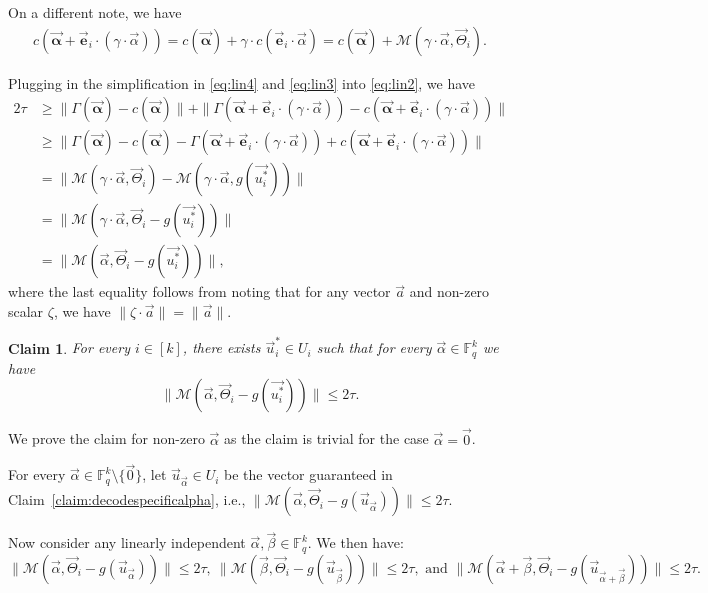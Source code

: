 \documentclass[10pt,a4paper]{article}
\newcommand{\F}{\mathbb{F}}
\renewcommand{\ge}{ \geqslant}
\renewcommand{\le}{ \leqslant}
\newtheorem{claim}[theorem]{Claim}
\renewcommand{\kappa}{\tau}
\newcommand{\M}{\mathcal{M}}
\begin{document}
 
On a different note, we have
\begin{align}
c(\vec{\bm{\alpha}}+\vec{\bm e}_i\cdot (\gamma\cdot\vec{\alpha}))=c(\vec{\bm{\alpha}})+\gamma\cdot c(\vec{\bm e}_i\cdot \vec{\alpha})=c(\vec{\bm{\alpha}})+\M(\gamma\cdot \vec{\alpha},\vec{\Theta}_i).
\label{eq:lin3}
\end{align}

Plugging in the simplification in \eqref{eq:lin4} and \eqref{eq:lin3} into \eqref{eq:lin2}, we have
\allowdisplaybreaks
\begin{align*}
2\kappa&\ge\|\Gamma(\vec{\bm{\alpha}})-c(\vec{\bm{\alpha}})\|+\|\Gamma(\vec{\bm{\alpha}}+\vec{\bm e}_i\cdot (\gamma\cdot\vec{\alpha}))-c(\vec{\bm{\alpha}}+\vec{\bm e}_i\cdot (\gamma\cdot\vec{\alpha}))\|\\
&\ge\|\Gamma(\vec{\bm{\alpha}})-c(\vec{\bm{\alpha}})-\Gamma(\vec{\bm{\alpha}}+\vec{\bm e}_i\cdot (\gamma\cdot\vec{\alpha}))+c(\vec{\bm{\alpha}}+\vec{\bm e}_i\cdot (\gamma\cdot\vec{\alpha}))\|\\
&=\|\M(\gamma\cdot \vec{\alpha},\vec{\Theta}_i)-\M(\gamma\cdot\vec{\alpha},g(\vec{u_i^\ast})) \|\\
&=\|\M(\gamma\cdot \vec{\alpha},\vec{\Theta}_i-g(\vec{u_i^\ast})) \|\\
&=\|\M(  \vec{\alpha},\vec{\Theta}_i-g(\vec{u_i^\ast})) \|,
\end{align*}
 where the last equality follows from noting that for any vector $\vec{a}$ and non-zero scalar $\zeta$, we have $\|\zeta\cdot \vec{a}\|=\|\vec{a}\|$.



 
 
\begin{claim}\label{claim:decodei}
For every $i\in[k]$, there exists $\vec{u}_i^\ast\in U_i$  such that  for every $\vec{\alpha}\in\F_q^k$ we have $$ \|\M(  \vec{\alpha},\vec{\Theta}_i-g(\vec{u_i^\ast})) \|\le 2\kappa.$$ 
\end{claim}

We prove the claim for non-zero $\vec{\alpha}$ as the claim is trivial for the case $\vec{\alpha}=\vec{0}$.

For every $\vec{\alpha}\in\F_q^k\setminus \{\vec{0}\}$, let $\vec{u}_{\vec{\alpha}}\in U_i$ be the vector guaranteed in Claim~\ref{claim:decodespecificalpha}, i.e., 
$\|\M(  \vec{\alpha},\vec{\Theta}_i-g(\vec{u}_{\vec{\alpha}})) \|\le 2\kappa$. 

Now consider any linearly independent $\vec{\alpha},\vec{\beta}\in\F_q^k$. We then have: 
 $$
 \|\M(  \vec{\alpha},\vec{\Theta}_i-g(\vec{u}_{\vec{\alpha}})) \|\le 2\kappa,\ \|\M(  \vec{\beta},\vec{\Theta}_i-g(\vec{u}_{\vec{\beta}})) \|\le 2\kappa,\text{ and }\|\M(  \vec{\alpha}+\vec{\beta},\vec{\Theta}_i-g(\vec{u}_{\vec{\alpha}+\vec{\beta}})) \|\le 2\kappa.
 $$
\end{document}
